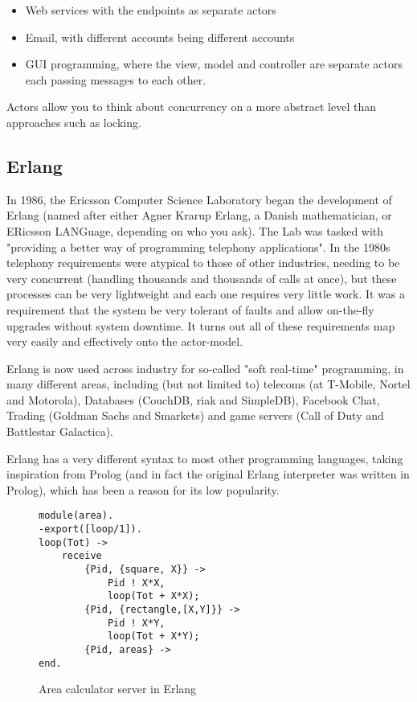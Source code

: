 \documentclass{article}
\begin{document}
\begin{itemize}
\item Web services with the endpoints as separate actors
\item Email, with different accounts being different accounts
\item GUI programming, where the view, model and controller are separate actors
	 each passing messages to each other.
\end{itemize}

Actors allow you to think about concurrency on a more abstract level than approaches such as
locking.

\subsection{Erlang}

In 1986, the Ericsson Computer Science Laboratory began the development of
Erlang\cite{armstrong2007} (named after either Agner Krarup Erlang, a Danish
mathematician, or ERicsson LANGuage, depending on who you ask). The Lab was
tasked with "providing a better way of programming telephony applications". In
the 1980s telephony requirements were atypical to those of other industries,
needing to be very concurrent (handling thousands and thousands of calls at
once), but these processes can be very lightweight and each one requires very
little work. It was a requirement that the system be very tolerant of
faults and allow on-the-fly upgrades without system downtime. It turns out all
of these requirements map very easily and effectively onto the actor-model.

Erlang is now used across industry for so-called "soft real-time" programming,
in many different areas, including (but not limited to) telecoms (at T-Mobile,
Nortel and Motorola), Databases (CouchDB, riak and SimpleDB), Facebook Chat,
Trading (Goldman Sachs and Smarkets) and game servers (Call of Duty and
Battlestar Galactica).

Erlang has a very different syntax to most other programming languages, taking
inspiration from Prolog (and in fact the original Erlang interpreter was written
in Prolog), which has been a reason for its low popularity.

\begin{figure}[H]
\begin{verbatim}
module(area).
-export([loop/1]).
loop(Tot) ->
    receive
        {Pid, {square, X}} ->
            Pid ! X*X,
            loop(Tot + X*X);
        {Pid, {rectangle,[X,Y]}} ->
            Pid ! X*Y,
            loop(Tot + X*Y);
        {Pid, areas} ->
end.
\end{verbatim}
\caption{Area calculator server in Erlang}
\label{fig:example_erlang_server}
\end{figure}
\end{document}
